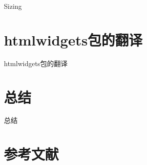 \documentclass[]{book}
\theoremstyle{definition}
\theoremstyle{definition}
\theoremstyle{definition}
\theoremstyle{remark}
\begin{document}
Sizing

\chapter{htmlwidgets包的翻译}\label{htmlwidgetsux5305ux7684ux7ffbux8bd1}

htmlwidgets包的翻译

\chapter{总结}

总结

\chapter{参考文献}


\end{document}
